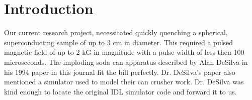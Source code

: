 \documentclass[prb,preprint]{revtex4-1}
\begin{document}
\section{Introduction} %

Our current research project, necessitated quickly quenching a spherical, superconducting sample of up to 3 cm in diameter.  This required a pulsed magnetic field of up to 2 kG in magnitude with a pulse width of less then 100 microseconds.  The imploding soda can apparatus described by Alan DeSilva in his 1994 paper\cite{desilvacan} in this journal fit the bill perfectly.  Dr. DeSilva's paper also mentioned a simulator used to model their can crusher work.  Dr. DeSilva was kind enough to locate the original IDL simulator code and forward it to us.  \\
\end{document}
